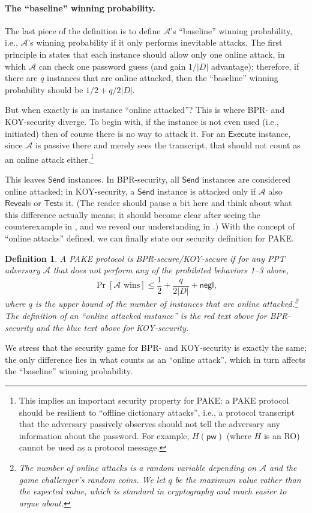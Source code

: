 \documentclass{article}
\newtheorem{definition}{Definition}
\newcommand{\negl}{\mathsf{negl}}
\newcommand{\adv}{\mathcal{A}}
\newcommand{\pw}{\mathsf{pw}}
\newcommand{\Execute}{\mathsf{Execute}}
\newcommand{\Send}{\mathsf{Send}}
\newcommand{\Reveal}{\mathsf{Reveal}}
\newcommand{\Test}{\mathsf{Test}}
\begin{document}
\paragraph{The ``baseline'' winning probability.}
The last piece of the definition is to define $\adv$'s ``baseline'' winning probability, i.e., $\adv$'s winning probability if it only performs inevitable attacks. The first principle in  states that each instance should allow only one online attack, in which $\adv$ can check one password guess (and gain $1/|D|$ advantage); therefore, if there are $q$ instances that are online attacked, then the ``baseline'' winning probability should be $1/2 + q/2|D|$.

But when exactly is an instance ``online attacked''? This is where BPR- and KOY-security diverge. To begin with, if the instance is not even used (i.e., initiated) then of course there is no way to attack it. For an $\Execute$ instance, since $\adv$ is passive there and merely sees the transcript, that should not count as an online attack either.\footnote{This implies an important security property for PAKE: a PAKE protocol should be resilient to ``offline dictionary attacks'', i.e., a protocol transcript that the adversary passively observes should not tell the adversary any information about the password. For example, $H(\pw)$ (where $H$ is an RO) cannot be used as a protocol message.}

This leaves $\Send$ instances. {\color{red}In BPR-security, all $\Send$ instances are considered online attacked}; {\color{blue}in KOY-security, a $\Send$ instance is attacked only if $\adv$ also $\Reveal$s or $\Test$s it}. (The reader should pause a bit here and think about what this difference actually means; it should become clear after seeing the counterexample in , and we reveal our understanding in .) With the concept of ``online attacks'' defined, we can finally state our security definition for PAKE.
\begin{definition}
A PAKE protocol is \emph{\textsf{BPR-secure/KOY-secure}} if for any PPT adversary $\adv$ that does not perform any of the prohibited behaviors 1--3 above,
\[
\Pr[\adv\text{ wins}] \leq \frac{1}{2} + \frac{q}{2|D|} + \negl,
\]
where $q$ is the upper bound of the number of instances that are online attacked.\footnote{The number of online attacks is a random variable depending on $\adv$ and the game challenger's random coins. We let $q$ be the maximum value rather than the expected value, which is standard in cryptography and much easier to argue about.} The definition of an ``online attacked instance'' is the red text above for BPR-security and the blue text above for KOY-security.
\end{definition}
We stress that the security game for BPR- and KOY-security is exactly the same; the only difference lies in what counts as an ``online attack'', which in turn affects the ``baseline'' winning probability.
\end{document}
